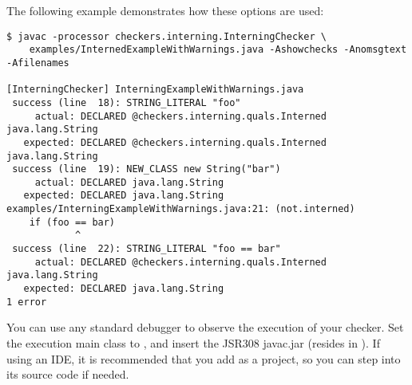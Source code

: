 The following example demonstrates how these options are used:

\begin{smaller}
\begin{Verbatim}
$ javac -processor checkers.interning.InterningChecker \
    examples/InternedExampleWithWarnings.java -Ashowchecks -Anomsgtext -Afilenames

[InterningChecker] InterningExampleWithWarnings.java
 success (line  18): STRING_LITERAL "foo"
     actual: DECLARED @checkers.interning.quals.Interned java.lang.String
   expected: DECLARED @checkers.interning.quals.Interned java.lang.String
 success (line  19): NEW_CLASS new String("bar")
     actual: DECLARED java.lang.String
   expected: DECLARED java.lang.String
examples/InterningExampleWithWarnings.java:21: (not.interned)
    if (foo == bar)
            ^
 success (line  22): STRING_LITERAL "foo == bar"
     actual: DECLARED @checkers.interning.quals.Interned java.lang.String
   expected: DECLARED java.lang.String
1 error
\end{Verbatim}
\end{smaller}

You can use any standard debugger to observe the execution of your checker.  Set the execution main class to , and insert the JSR308 javac.jar (resides in ).  If using an IDE, it is recommended that you add  as a project, so you can
step into its source code if needed.

%
%



